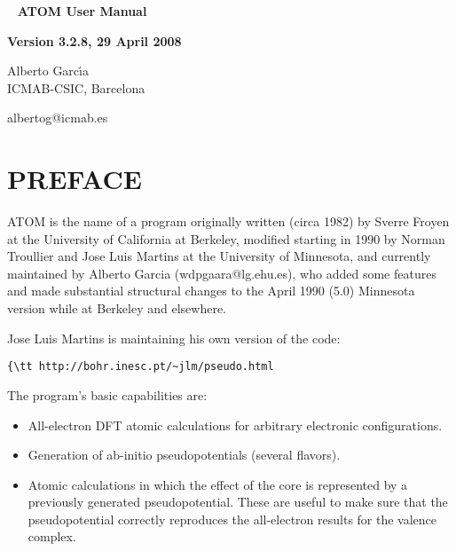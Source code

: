\documentclass[11pt]{article}
\begin{document}

\begin{titlepage}

\begin{center}
~
\vfill
\vspace{1cm}
{\Huge {\bf ATOM User Manual}}
\par\vspace{3cm}
\hrulefill
\par\vspace{3cm}
{\Large {\bf Version 3.2.8, 29 April 2008}}
\par\vspace{2cm}
\hrulefill

{\Large Alberto Garc\'{\i}a \\
ICMAB-CSIC, Barcelona

albertog@icmab.es}
\vfill
\end{center}

\end{titlepage}

\tableofcontents
\newpage

\section{PREFACE}

{\sc ATOM} is the name of a program originally written (circa 1982) by
Sverre Froyen at the University of California at Berkeley, modified
starting in 1990 by Norman Troullier and Jose Luis Martins at the
University of Minnesota, and currently maintained by Alberto Garcia
(wdpgaara@lg.ehu.es), who added some features and made substantial
structural changes to the April 1990 (5.0) Minnesota version while at
Berkeley and elsewhere.

Jose Luis Martins is maintaining his own version of the code:
\begin{verbatim}{\tt http://bohr.inesc.pt/~jlm/pseudo.html\end{verbatim}


The program's basic capabilities are:

\begin{itemize}
\item All-electron DFT atomic calculations for arbitrary electronic
configurations.

\item Generation of ab-initio pseudopotentials (several flavors).

\item Atomic calculations in which the effect of the core is represented
by a previously generated pseudopotential. These are useful to make
sure that the pseudopotential correctly reproduces the all-electron
results for the valence complex.

\end{itemize}
\end{document}
